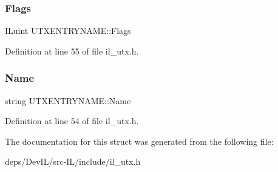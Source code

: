 \subsubsection{\texorpdfstring{Flags}{Flags}}
{\footnotesize\ttfamily I\+Luint U\+T\+X\+E\+N\+T\+R\+Y\+N\+A\+M\+E\+::\+Flags}



Definition at line 55 of file il\+\_\+utx.\+h.

\mbox{\label{structUTXENTRYNAME_a18c6a264905177a9ac0b741770115791}} 
\subsubsection{\texorpdfstring{Name}{Name}}
{\footnotesize\ttfamily string U\+T\+X\+E\+N\+T\+R\+Y\+N\+A\+M\+E\+::\+Name}



Definition at line 54 of file il\+\_\+utx.\+h.



The documentation for this struct was generated from the following file\+:\begin{DoxyCompactItemize}
\item 
deps/\+Dev\+I\+L/src-\/\+I\+L/include/il\+\_\+utx.\+h\end{DoxyCompactItemize}
